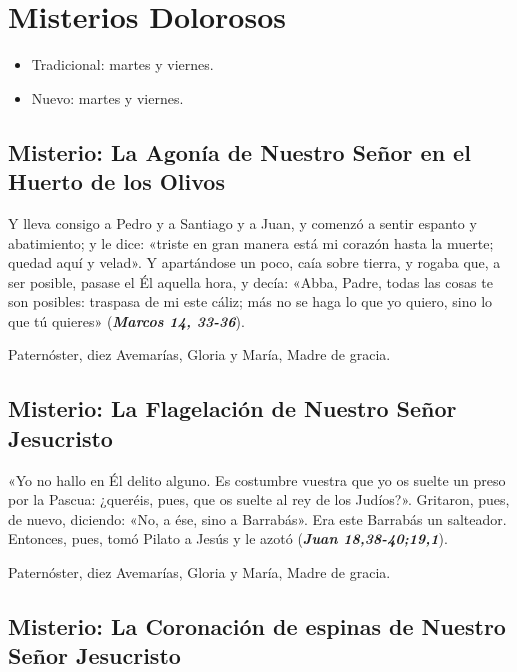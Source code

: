 \documentclass[./rosary.tex]{subfiles}
\newcounter{sorrowful-counter}
\begin{document}
\section*{Misterios Dolorosos}
\begin{itemize}
      \item Tradicional: martes y viernes.
      \item Nuevo: martes y viernes.
\end{itemize}

\subsection*{ Misterio: La Agonía de Nuestro Señor en el Huerto de los Olivos}

Y lleva consigo a Pedro y a Santiago y a Juan, y comenzó a sentir espanto y abatimiento; y le dice:
«triste en gran manera está mi corazón hasta la muerte; quedad aquí y velad». Y apartándose un poco,
caía sobre tierra, y rogaba que, a ser posible, pasase el Él aquella hora, y decía: «Abba, Padre, todas las cosas te son posibles:
traspasa de mi este cáliz; más no se haga lo que yo quiero, sino lo que tú quieres» (\textbf{\emph{Marcos 14, 33-36}}).

\begin{center}
      Paternóster, diez Avemarías, Gloria y María, Madre de gracia.
\end{center}

\subsection*{ Misterio: La Flagelación de Nuestro Señor Jesucristo}

«Yo no hallo en Él delito alguno. Es costumbre vuestra que yo os suelte un preso por la Pascua:
¿queréis, pues, que os suelte al rey de los Judíos?». Gritaron, pues, de nuevo, diciendo: «No, a ése, sino a Barrabás».
Era este Barrabás un salteador. Entonces, pues, tomó Pilato a Jesús y le azotó (\textbf{\emph{Juan 18,38-40;19,1}}).

\begin{center}
      Paternóster, diez Avemarías, Gloria y María, Madre de gracia.
\end{center}

\subsection*{ Misterio: La Coronación de espinas de Nuestro Señor Jesucristo}
\end{document}
